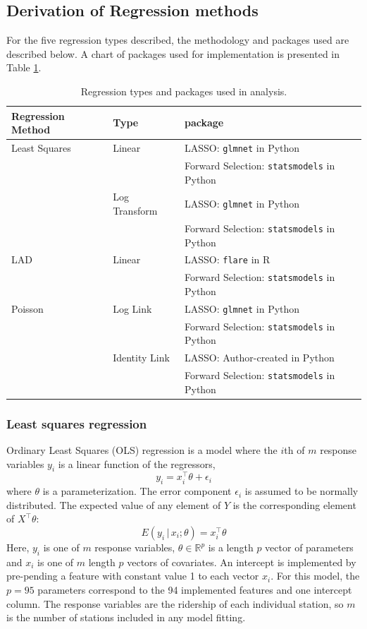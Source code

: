 \documentclass[11pt]{article}
\begin{document}
\subsection{Derivation of Regression methods}\label{sec:derive}
For the five regression types described, the methodology and packages used are described below. A chart of packages used for implementation is presented in Table \ref{tab:regtype}.

\begin{table} [H]
\centering
\begin{tabular}{lll}
\toprule Regression Method&Type&package\\
\midrule Least Squares&Linear&LASSO: \texttt{glmnet} in Python\\
&&Forward Selection: \texttt{statsmodels} in Python\\
&Log Transform&LASSO: \texttt{glmnet} in Python\\
&&Forward Selection: \texttt{statsmodels} in Python\\
LAD&Linear&LASSO: \texttt{flare} in R\\
&&Forward Selection: \texttt{statsmodels} in Python\\
Poisson&Log Link&LASSO: \texttt{glmnet} in Python\\
&&Forward Selection: \texttt{statsmodels} in Python\\
&Identity Link&LASSO: Author-created in Python\\
&&Forward Selection: \texttt{statsmodels} in Python\\
\bottomrule
\end{tabular}
\caption{Regression types and packages used in analysis.}
\label{tab:regtype}
\end{table}



\subsubsection{Least squares regression}\label{sec:lstsq}

Ordinary Least Squares (OLS) regression is a model where the $i$th of $m$ response variables $y_i$ is a linear function of the regressors,
\[y_i = x_i^\top\theta + \epsilon_i\] where $\theta$ is a parameterization. The error component $\epsilon_i$ is assumed to be normally distributed. The expected value of any element of $Y$ is the corresponding element of $X^\top\theta$:
\[E(y_i\,|\,x_i; \theta) = x_i^\top\theta\]
Here, $y_i$ is one of $m$ response variables, $\theta\in\mathbb{R}^p$ is a length $p$ vector of parameters and $x_i$ is one of $m$ length $p$ vectors of covariates. An intercept is implemented by pre-pending a feature with constant value 1 to each vector $x_i$. For this model, the $p=95$ parameters correspond to the 94 implemented features and one intercept column. The response variables are the ridership of each individual station, so $m$ is the number of stations included in any model fitting.  
\end{document}
